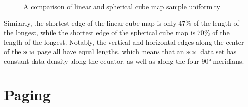 \documentclass[oneside,10pt]{memoir}
\newcommand{\scm}     {\textsc{scm}}
\begin{document}
\begin{Spacing}{1.1}
\begin{figure}
  \centering
  \hfil
  \hfil
  \caption{A comparison of linear and spherical cube map sample uniformity}
  \label{fig:uniformity}
\end{figure}

Similarly, the shortest edge of the linear cube map is only $47\%$ of the length of the longest, while the shortest edge of the spherical cube map is $70\%$ of the length of the longest.  Notably, the vertical and horizontal edges along the center of the \scm\ page all have equal lengths, which means that an \scm\ data set has constant data density along the equator, as well as along the four \ang{90} meridians.

\section{Paging}
\label{sec:paging}


\end{Spacing}
\end{document}
